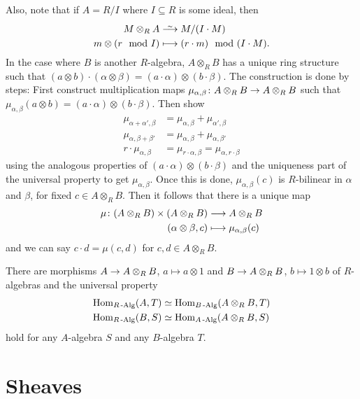 \documentclass[a4paper,parskip=half,numbers=enddot, DIV=12]{scrreprt}
\begin{document}
Also, note that if $A=R/I$ where $I\subseteq R$ is some ideal, then 
\begin{align*}
    M\otimes_R A &\isomorphism M/(I\cdot M)\\
    m\otimes(r\mod I) &\longmapsto (r\cdot m) \mod (I\cdot M).
\end{align*}
In the case where $B$ is another $R$-algebra, $A\otimes_R B$ has a unique ring structure such that $(a\otimes b)\cdot(\alpha \otimes \beta) = (a \cdot \alpha)\otimes (b\cdot \beta)$. The construction is done by steps: First construct multiplication maps $\mu_{\alpha, \beta}\colon A\otimes_R B \morphism A\otimes_R B$ such that $\mu_{\alpha,\beta} (a\otimes b) = (a\cdot \alpha)\otimes (b\cdot \beta)$. Then show
\begin{align*}
    \mu_{\alpha+\alpha',\beta} &= \mu_{\alpha,\beta}+\mu_{\alpha',\beta}\\
    \mu_{\alpha,\beta+\beta'} &= \mu_{\alpha,\beta}+\mu_{\alpha,\beta'}\\
    r\cdot \mu_{\alpha,\beta} &= \mu_{r\cdot \alpha,\beta} =\mu_{\alpha,r\cdot \beta}
\end{align*}
using the analogous properties of $(a\cdot \alpha) \otimes (b\cdot \beta)$ and the uniqueness part of the universal property to get $\mu_{\alpha,\beta}$. Once this is done, $\mu_{\alpha,\beta}(c)$ is $R$-bilinear in $\alpha$ and $\beta$, for fixed $c\in A\otimes_R B$. Then it follows that there is a unique map
\begin{align*}
    \mu\colon (A\otimes_R B) \times (A\otimes_R B) &\morphism A\otimes_R B\\
    (\alpha \otimes \beta, c) &\longmapsto \mu_{\alpha,\beta}(c)
\end{align*}
and we can say $c\cdot d = \mu(c,d)$ for $c,d\in A\otimes_R B$.

There are morphisms $A\morphism A\otimes_R B$, $a\mapsto a\otimes 1$ and $B\morphism A\otimes_R B$, $b\mapsto 1\otimes b$ of $R$-algebras and the universal property
\begin{align*}
    \operatorname{Hom}_{R\operatorname{-Alg}} (A,T) &\simeq \operatorname{Hom}_{B\operatorname{-Alg}}(A\otimes_R B, T)\\
    \operatorname{Hom}_{R\operatorname{-Alg}} (B,S) &\simeq \operatorname{Hom}_{A\operatorname{-Alg}}(A\otimes_R B, S)
\end{align*}
hold for any $A$-algebra $S$ and any $B$-algebra $T$.

\section{Sheaves}
\end{document}

